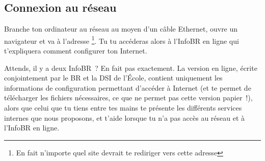 
\subsection{Connexion au réseau}

Branche ton ordinateur au réseau au moyen d'un câble Ethernet, ouvre un navigateur et va à l'adresse \footnote{En fait n'importe quel site devrait te rediriger vers cette adresse}. Tu tu accéderas alors à l'InfoBR en ligne qui t'expliquera comment configurer ton Internet.

Attends, il y a deux InfoBR~? En fait pas exactement. La version en ligne, écrite conjointement par le BR et la DSI de l'École,  contient uniquement les informations de configuration permettant d'accéder à Internet (et te permet de télécharger les fichiers nécessaires, ce que ne permet pas cette version papier~!), alors que celui que tu tiens entre tes mains te présente les différents services internes que nous proposons, et t'aide lorsque tu n'a pas accès au réseau et à l'InfoBR en ligne.
